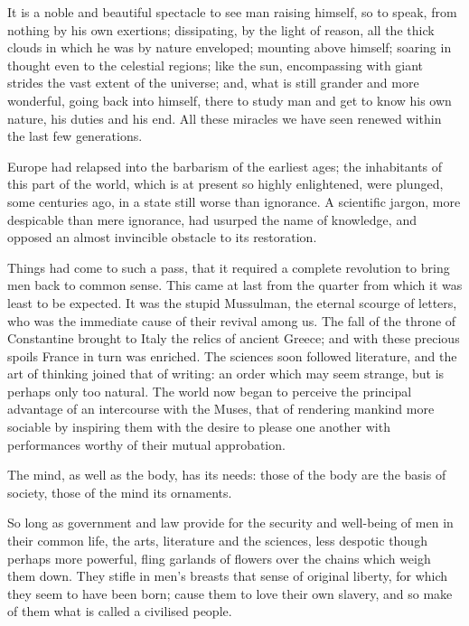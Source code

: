 It is a noble and beautiful spectacle to see man raising himself, so
to speak, from nothing by his own exertions; dissipating, by the light
of reason, all the thick clouds in which he was by nature enveloped;
mounting above himself; soaring in thought even to the celestial
regions; like the sun, encompassing with giant strides the vast extent
of the universe; and, what is still grander and more wonderful, going
back into himself, there to study man and get to know his own nature,
his duties and his end. All these miracles we have seen renewed within
the last few generations.

Europe had relapsed into the barbarism of the earliest ages; the
inhabitants of this part of the world, which is at present so highly
enlightened, were plunged, some centuries ago, in a state still worse
than ignorance. A scientific jargon, more despicable than mere
ignorance, had usurped the name of knowledge, and opposed an almost
invincible obstacle to its restoration.

Things had come to such a pass, that it required a complete revolution
to bring men back to common sense. This came at last from the quarter
from which it was least to be expected. It was the stupid Mussulman,
the eternal scourge of letters, who was the immediate cause of their
revival among us. The fall of the throne of Constantine brought to
Italy the relics of ancient Greece; and with these precious spoils
France in turn was enriched. The sciences soon followed literature,
and the art of thinking joined that of writing: an order which may
seem strange, but is perhaps only too natural. The world now began to
perceive the principal advantage of an intercourse with the Muses,
that of rendering mankind more sociable by inspiring them with the
desire to please one another with performances worthy of their mutual
approbation.

The mind, as well as the body, has its needs: those of the body are
the basis of society, those of the mind its ornaments.

So long as government and law provide for the security and well-being
of men in their common life, the arts, literature and the sciences,
less despotic though perhaps more  powerful, fling garlands
of flowers over the chains which weigh them down. They stifle in men's
breasts that sense of original liberty, for which they seem to have
been born; cause them to love their own slavery, and so make of them
what is called a civilised people.

